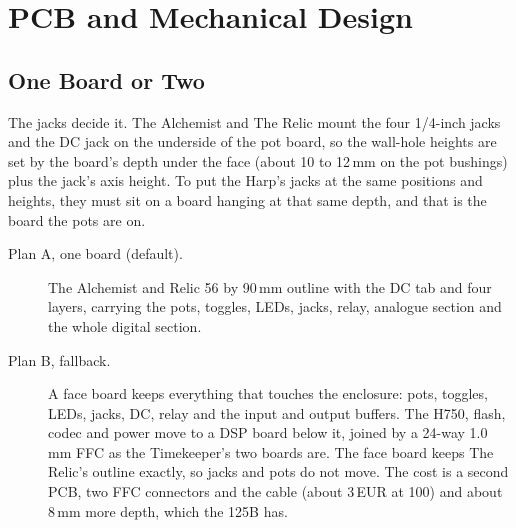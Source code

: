 \chapter{PCB and Mechanical Design}\label{ch:pcb}

\section{One Board or Two}
The jacks decide it. The Alchemist and The Relic mount the four 1/4-inch jacks and the DC jack on the underside of the pot board, so the wall-hole heights are set by the board's depth under the face (about 10 to 12\,mm on the pot bushings) plus the jack's axis height. To put the Harp's jacks at the same positions and heights, they must sit on a board hanging at that same depth, and that is the board the pots are on.

\begin{description}
  \item[Plan A, one board (default).] The Alchemist and Relic 56 by 90\,mm outline with the DC tab and four layers, carrying the pots, toggles, LEDs, jacks, relay, analogue section and the whole digital section.
  \item[Plan B, fallback.] A face board keeps everything that touches the enclosure: pots, toggles, LEDs, jacks, DC, relay and the input and output buffers. The H750, flash, codec and power move to a DSP board below it, joined by a 24-way 1.0\,mm FFC as the Timekeeper's two boards are. The face board keeps The Relic's outline exactly, so jacks and pots do not move. The cost is a second PCB, two FFC connectors and the cable (about 3\,EUR at 100) and about 8\,mm more depth, which the 125B has.
\end{description}

